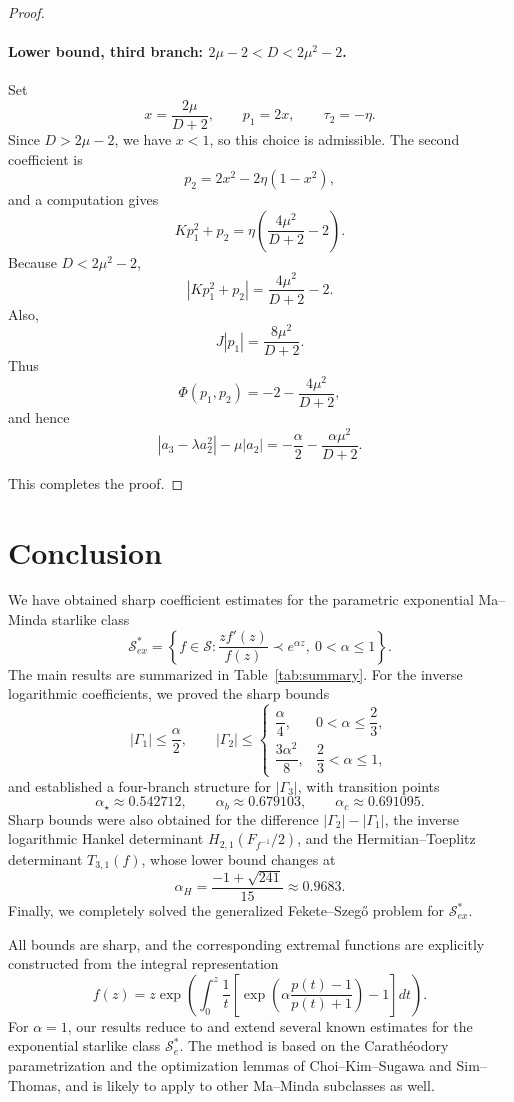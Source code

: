 \documentclass[11pt,reqno]{amsart}
\numberwithin{equation}{section}
\begin{document}
\begin{proof}
\paragraph{Lower bound, third branch: $2\mu-2<D<2\mu^2-2$.}
Set
\[
x=\frac{2\mu}{D+2},
\qquad
p_1=2x,
\qquad
\tau_2=-\eta.
\]
Since $D>2\mu-2$, we have $x<1$, so this choice is admissible. The second coefficient is
\[
p_2=2x^2-2\eta(1-x^2),
\]
and a computation gives
\[
Kp_1^2+p_2
=
\eta\left(\frac{4\mu^2}{D+2}-2\right).
\]
Because $D<2\mu^2-2$,
\[
|Kp_1^2+p_2|
=
\frac{4\mu^2}{D+2}-2.
\]
Also,
\[
J|p_1|
=
\frac{8\mu^2}{D+2}.
\]
Thus
\[
\Phi(p_1,p_2)
=
-2-\frac{4\mu^2}{D+2},
\]
and hence
\[
|a_3-\lambda a_2^2|-\mu|a_2|
=
-\frac{\alpha}{2}-\frac{\alpha\mu^2}{D+2}.
\]

This completes the proof.
\end{proof}
\section*{Conclusion}

We have obtained sharp coefficient estimates for the parametric exponential Ma--Minda starlike class
\[
\mathcal{S}_{ex}^{\ast}
=
\left\{
f\in\mathcal{S}:
\frac{zf'(z)}{f(z)}
\prec e^{\alpha z},\ 0<\alpha\le1
\right\}.
\]
The main results are summarized in Table~\ref{tab:summary}. For the inverse logarithmic coefficients, we proved the sharp bounds
\[
|\Gamma_1|\le \frac{\alpha}{2},
\qquad
|\Gamma_2|\le
\begin{cases}
\dfrac{\alpha}{4}, & 0<\alpha\le\dfrac23,\\[4pt]
\dfrac{3\alpha^2}{8}, & \dfrac23<\alpha\le1,
\end{cases}
\]
and established a four-branch structure for \(|\Gamma_3|\), with transition points
\[
\alpha_\star\approx0.542712,\qquad
\alpha_b\approx0.679103,\qquad
\alpha_c\approx0.691095.
\]
Sharp bounds were also obtained for the difference \(|\Gamma_2|-|\Gamma_1|\), the inverse logarithmic Hankel determinant \(H_{2,1}(F_{f^{-1}}/2)\), and the Hermitian--Toeplitz determinant \(T_{3,1}(f)\), whose lower bound changes at
\[
\alpha_H=\frac{-1+\sqrt{241}}{15}\approx0.9683.
\]
Finally, we completely solved the generalized Fekete--Szeg\H{o} problem for \(\mathcal{S}_{ex}^{\ast}\).

All bounds are sharp, and the corresponding extremal functions are explicitly constructed from the integral representation
\[
f(z)
=
z\exp\left(
\int_0^z \frac{1}{t}
\left[
\exp\left(
\alpha\frac{p(t)-1}{p(t)+1}
\right)
-1
\right]
dt
\right).
\]
For \(\alpha=1\), our results reduce to and extend several known estimates for the exponential starlike class \(\mathcal{S}_e^*\). The method is based on the Carath\'eodory parametrization and the optimization lemmas of Choi--Kim--Sugawa and Sim--Thomas, and is likely to apply to other Ma--Minda subclasses as well.
\end{document}
